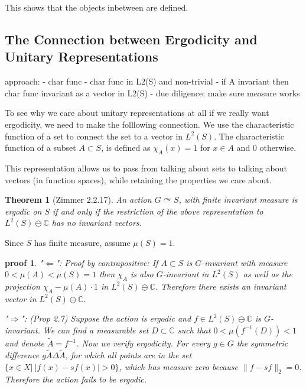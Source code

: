 \documentclass[
  12pt
]{article}
\theoremstyle{break}
\newtheorem{thm}{Theorem}
\theoremstyle{plain}
\newtheorem*{pf}{proof}
\begin{document}
  This shows that the objects inbetween are defined.


  \hypertarget{the-connection-between-ergodicity-and-unitary-representations}{%
  \subsection{The Connection between Ergodicity and Unitary Representations}\label{the-connection-between-ergodicity-and-unitary-representations}}

  approach: 
    - char func 
    - char func in L2(S) and non-trivial 
    - if A invariant then char func invariant as a vector in L2(S) 
    - due diligence: make sure measure works

  To see why we care about unitary representations at all if we really
  want ergodicity, we need to make the folllowing connection. We use the
  characteristic function of a set to connect the set to a vector in
  $L^2(S)$. The characteristic function of a subset $A\subset S$, is
  defined as $\chi_A(x) = 1$ for $x \in A$ and $0$ otherwise.

  This representation allows us to pass from talking about sets to talking
  about vectors (in function spaces), while retaining the properties we care
  about.

  \begin{thm}[Zimmer 2.2.17]
    \label{thm:2.2.17}
    An action $G\curvearrowright S$, with \emph{ finite } invariant measure is
    ergodic on $S$ if and only if the restriction of the above representation
    to $L^2(S) \ominus \mathbb{C}$ has no invariant vectors.
  \end{thm}
    
  Since $S$ has finite measure, assume $\mu(S) =1$.

  \begin{pf}

    "$\Leftarrow$": Proof by contrapositive:
    If $A\subset S$ is $G$-invariant
    with measure $0 < \mu(A) < \mu(S) = 1$ then $\chi_A$ is also $G$-invariant
    in $L^2(S)$ as well as the projection $\chi_A - \mu(A)\cdot 1$ in
    $L^2(S)\ominus \mathbb{C}$. Therefore there exists an invariant vector in
    $L^2(S)\ominus \mathbb{C}$.

    "$\Rightarrow$": \cite{Kerr16}(Prop 2.7)
    Suppose the action is ergodic and $f\in L^2(S)\ominus \mathbb{C}$ is
    $G$-invariant. We can find a measurable set $D\subset \mathbb{C}$ such that
    $0<\mu(f^{-1}(D)) < 1$ and denote $\widetilde{A} = f^{-1}$. Now we verify
    ergodicity. For every $g\in G$ the symmetric difference $g\widetilde{A}
    \Delta \widetilde{A}$, for which all points are in the set $\{x \in X | \
    |f(x)-sf(x)| > 0\}$, which has measure zero because $\|f- sf\|_2=0$.
    Therefore the action fails to be ergodic.
  \end{pf}
\end{document}
